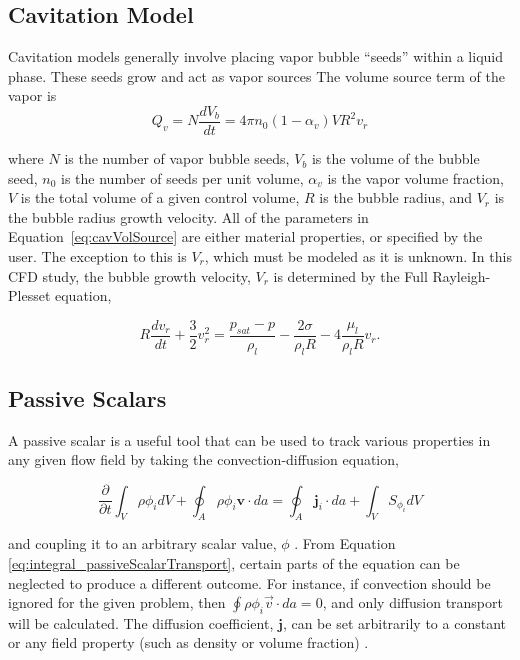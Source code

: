 \documentclass{UCF_ETD}
\begin{document}
\subsection{Cavitation Model}
\label{sec:cavitation}
Cavitation models generally involve placing vapor bubble ``seeds'' within a liquid phase. These seeds grow and act as vapor sources The volume source term of the vapor is
\begin{equation}
    Q_{v} = N \frac{dV_{b}}{dt} = 4\pi n_{0}(1- \alpha_{v})VR^{2}v_{r}
    \label{eq:cavVolSource}
\end{equation}

\noindent where $N$ is the number of vapor bubble seeds, $V_{b}$ is the volume of the bubble seed, $n_{0}$ is the number of seeds per unit volume, $\alpha_{v}$ is the vapor volume fraction, $V$ is the total volume of a given control volume, $R$ is the bubble radius, and $V_{r}$ is the bubble radius growth velocity. All of the parameters in Equation~\ref{eq:cavVolSource} are either material properties, or specified by the user. The exception to this is $V_{r}$, which must be modeled as it is unknown. In this CFD study, the bubble growth velocity, $V_{r}$ is determined by the Full Rayleigh-Plesset equation,

\begin{equation}
    R \frac{dv_{r}}{dt} + \frac{3}{2} v_{r}^{2}=\frac{p_{sat} - p}{\rho_{l}}- \frac{2\sigma}{\rho_{l}R} - 4\frac{\mu_{l}}{\rho_{l}R}v_{r}.
    \label{eq:FullRayleighPlesset}
\end{equation}

\subsection{Passive Scalars}
A passive scalar is a useful tool that can be used to track various properties in any given flow field by taking the convection-diffusion equation,

\begin{equation}
    \frac{\partial}{\partial t} \int_{V} \rho \phi_{i}dV + \oint_{A} \rho \phi_{i} \textbf{v} \cdot da = \oint_{A} \textbf{j}_{i}\cdot da +\int_{V} S_{\phi_{i}}dV
    \label{eq:integral_passiveScalarTransport}
\end{equation}

\noindent and coupling it to an arbitrary scalar value, $\phi$ \cite{Kirby_2010}. From Equation \ref{eq:integral_passiveScalarTransport}, certain parts of the equation can be neglected to produce a different outcome. For instance, if convection should be ignored for the given problem, then $\oint \rho \phi_{i} \Vec{v} \cdot da=0$, and only diffusion transport will be calculated. The diffusion coefficient, $\textbf{j}$, can be set arbitrarily to a constant or any field property (such as density or volume fraction) \cite{Kirby_2010, starccm}. 
\end{document}
